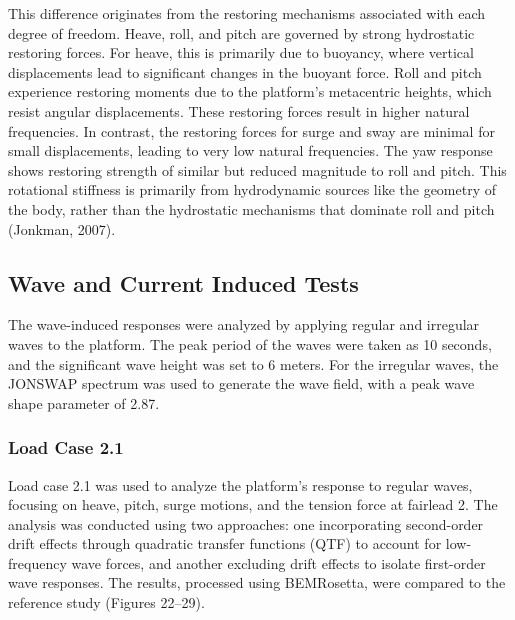 \documentclass[a4paper, 11pt]{article}
\begin{document}
This difference originates from the restoring mechanisms associated with each degree of freedom. Heave, roll, and pitch are governed by strong hydrostatic restoring forces. For heave, this is primarily due to buoyancy, where vertical displacements lead to significant changes in the buoyant force. Roll and pitch experience restoring moments due to the platform's metacentric heights, which resist angular displacements. These restoring forces result in higher natural frequencies. In contrast, the restoring forces for surge and sway are minimal for small displacements, leading to very low natural frequencies. The yaw response shows restoring strength of similar but reduced magnitude to roll and pitch. This rotational stiffness is primarily from hydrodynamic sources like the geometry of the body, rather than the hydrostatic mechanisms that dominate roll and pitch (Jonkman, 2007).


\subsection{Wave and Current Induced Tests}
\hspace*{0.5cm}The wave-induced responses were analyzed by applying regular and irregular waves to the platform. The peak period of the waves were taken as 10 seconds, and the significant wave height was set to 6 meters. For the irregular waves, the JONSWAP spectrum was used to generate the wave field, with a peak wave shape parameter of 2.87. 


\subsubsection{Load Case 2.1}

\hspace{0.5cm}Load case 2.1 was used to analyze the platform’s response to regular waves, focusing on heave, pitch, surge motions, and the tension force at fairlead 2. The analysis was conducted using two approaches: one incorporating second-order drift effects through quadratic transfer functions (QTF) to account for low-frequency wave forces, and another excluding drift effects to isolate first-order wave responses. The results, processed using BEMRosetta, were compared to the reference study (Figures 22–29).
\end{document}
